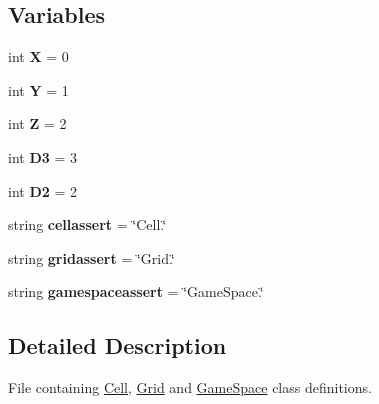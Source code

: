 \subsection*{\-Variables}
\begin{DoxyCompactItemize}
\item 
\hypertarget{namespaceSpace_a5b22449e08fb442d7bdc083428789714}{int {\bfseries \-X} = 0}\label{namespaceSpace_a5b22449e08fb442d7bdc083428789714}

\item 
\hypertarget{namespaceSpace_a1af791a727f2219ecd44e12aa8868872}{int {\bfseries \-Y} = 1}\label{namespaceSpace_a1af791a727f2219ecd44e12aa8868872}

\item 
\hypertarget{namespaceSpace_a61fa8c21f1a46663cd92d9256532154e}{int {\bfseries \-Z} = 2}\label{namespaceSpace_a61fa8c21f1a46663cd92d9256532154e}

\item 
\hypertarget{namespaceSpace_adb882bf3b26a5b4f7210bc9dead16334}{int {\bfseries \-D3} = 3}\label{namespaceSpace_adb882bf3b26a5b4f7210bc9dead16334}

\item 
\hypertarget{namespaceSpace_a9c552ca3d1e992e9cf4bf6656bfe1fc3}{int {\bfseries \-D2} = 2}\label{namespaceSpace_a9c552ca3d1e992e9cf4bf6656bfe1fc3}

\item 
\hypertarget{namespaceSpace_a24dce6fc17c893a134d136b8361ee25a}{string {\bfseries cellassert} = \char`\"{}\-Cell.\char`\"{}}\label{namespaceSpace_a24dce6fc17c893a134d136b8361ee25a}

\item 
\hypertarget{namespaceSpace_a1b2e0dd9dbd4679c9731efad20da31d3}{string {\bfseries gridassert} = \char`\"{}\-Grid.\char`\"{}}\label{namespaceSpace_a1b2e0dd9dbd4679c9731efad20da31d3}

\item 
\hypertarget{namespaceSpace_a927a89dd4c2b7d7c2aef66dbdb2b1fce}{string {\bfseries gamespaceassert} = \char`\"{}\-Game\-Space.\char`\"{}}\label{namespaceSpace_a927a89dd4c2b7d7c2aef66dbdb2b1fce}

\end{DoxyCompactItemize}


\subsection{\-Detailed \-Description}
\-File containing \hyperlink{classSpace_1_1Cell}{\-Cell}, \hyperlink{classSpace_1_1Grid}{\-Grid} and \hyperlink{classSpace_1_1GameSpace}{\-Game\-Space} class definitions. 